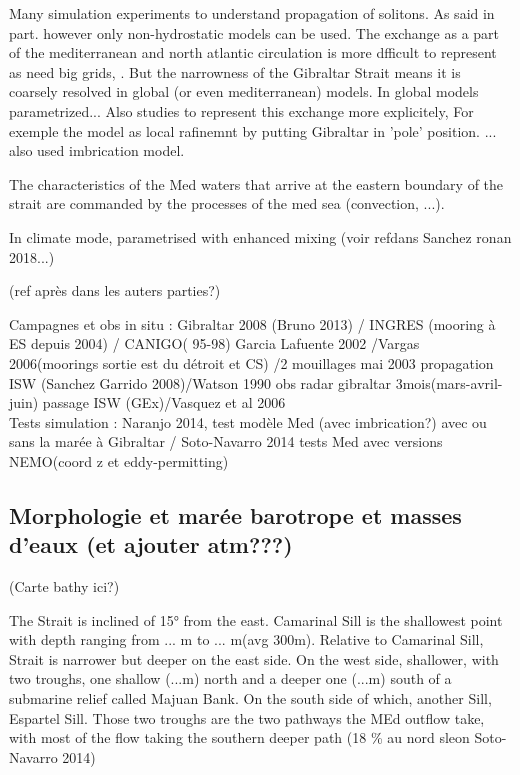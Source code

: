 Many simulation experiments to understand propagation of solitons. As said in part. however only non-hydrostatic models can be used. The exchange as a part of the mediterranean and north atlantic circulation is more dfficult to represent as need big grids, . 
But the narrowness of the Gibraltar Strait means it is coarsely resolved in global (or even mediterranean) models. In global models parametrized...
Also studies to represent this exchange more explicitely, For exemple the model as local rafinemnt by putting Gibraltar in 'pole' position. ... also used imbrication model.

The characteristics of the Med waters that arrive at the eastern boundary of the strait are commanded by the processes of the med sea (convection, ...). 


In climate mode, parametrised with enhanced mixing (voir refdans Sanchez ronan 2018...)

(ref après dans les auters parties?)

Campagnes et obs in situ : Gibraltar 2008 (Bruno 2013) / INGRES (mooring à ES depuis 2004) / CANIGO( 95-98) Garcia Lafuente 2002 /Vargas 2006(moorings sortie est du détroit et CS) /2 mouillages mai 2003 propagation ISW (Sanchez Garrido 2008)/Watson 1990 obs radar gibraltar 3mois(mars-avril-juin) passage ISW (GEx)/Vasquez et al 2006\\

Tests simulation : Naranjo 2014, test modèle Med (avec imbrication?) avec ou sans la marée à Gibraltar / Soto-Navarro 2014 tests Med avec versions NEMO(coord z et eddy-permitting)



\subsection{Morphologie et marée barotrope et masses d'eaux (et ajouter atm???)}

(Carte bathy ici?)

The Strait is inclined of 15° from the east. Camarinal Sill is the shallowest point with depth ranging from ... m to ... m(avg 300m). Relative to Camarinal Sill, Strait is narrower but deeper on the east side. On the west side, shallower, with two troughs, one shallow (...m) north and a deeper one (...m) south of a submarine relief called Majuan Bank. On the south side of which, another Sill, Espartel Sill. Those two troughs are the two pathways the MEd outflow take, with most of the flow taking the southern deeper path (18 \% au nord sleon Soto-Navarro 2014)



